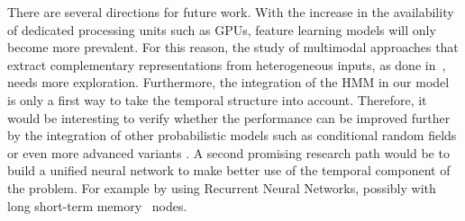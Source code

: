 There are several directions for future work. With the increase in the availability of dedicated processing units such as GPUs, feature learning models will only become more prevalent. For this reason, the study of multimodal approaches that extract complementary representations from heterogeneous inputs, as done in~\cite{neverova2014moddrop}, needs more exploration.
Furthermore, the integration of the HMM in our model is only a first way to take the temporal structure into account. Therefore, it would be interesting to verify whether the performance can be improved further by the integration of other probabilistic models such as conditional random fields or even more advanced variants \cite{wang2006hidden}. A second promising research path would be to build a unified neural network to make better use of the temporal component of the problem. For example by using Recurrent Neural Networks, possibly with long short-term memory~\cite{graves2009novel} nodes.



\endinput
